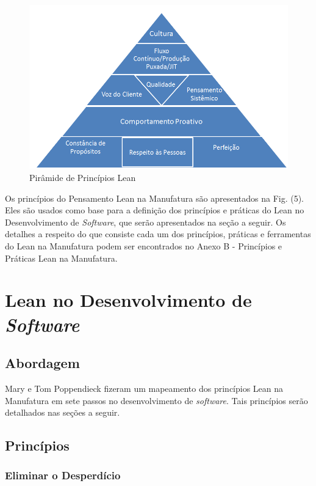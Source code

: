 \begin{figure}[H]
		\centering
		\label{fig02}
			\includegraphics[scale=0.7]{figuras/principioslean.png}
		\caption{Pirâmide de Princípios Lean}
\end{figure}

Os princípios do Pensamento Lean na Manufatura são apresentados na Fig. (5). Eles são usados como base para a definição dos princípios e práticas do Lean no Desenvolvimento de \textit{Software}, que serão apresentados na seção a seguir. Os detalhes a respeito do que consiste cada um dos princípios, práticas e ferramentas do Lean na Manufatura podem ser encontrados no Anexo B - Princípios e Práticas Lean na Manufatura.

\section[Lean no Desenvolvimento de \textit{Software}]{Lean no Desenvolvimento de \textit{ Software}}

\subsection[Abordagem]{Abordagem}

Mary e Tom Poppendieck fizeram um mapeamento dos princípios Lean na Manufatura em sete passos no desenvolvimento de \textit{software}. Tais princípios serão detalhados nas seções a seguir. 

\subsection[Princípios]{Princípios}

\subsubsection[Eliminar o Desperdício]{Eliminar o Desperdício}

